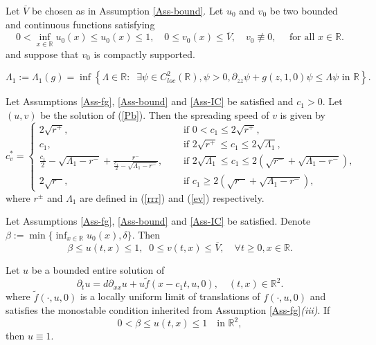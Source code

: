 \documentclass[10pt,a4paper]{amsart}
\newcommand{\R}{\mathbb{R}}
\renewcommand{\eqref}[1]{(\ref{#1})}
\begin{document}
\begin{assumption}\label{Ass-IC}
Let  $\overline{V}$ be chosen  as in Assumption \ref{Ass-bound}.  Let $u_0$ and $v_0$ be two bounded and continuous functions satisfying
$$
0<\inf_{x\in\R} u_0(x)\le u_0(x) \le 1,
\quad
0\le v_0(x)\le \overline{V},\quad
v_0\not\equiv 0,  \quad \text{ for all }   x\in \R. 
$$
and suppose that $v_0$ is compactly supported. 
\end{assumption}

\begin{equation}\label{ev}
\Lambda_1 := \Lambda_1(g)= \inf\left\{ \Lambda \in \R: \;\;  \exists \psi \in C^2_{loc} (\R), \psi>0,  \partial_{zz} \psi + g(z, 1,0) \psi \leq \Lambda \psi \text{ in } \R  \right\}.
\end{equation}

\begin{theorem}\label{Thm1}
Let Assumptions \ref{Ass-fg}, \ref{Ass-bound} and \ref{Ass-IC} be satisfied and $c_1>0$.  Let $(u,v)$ be the solution of  \eqref{Pb}.   Then the  spreading speed of $v$ is given by 
\begin{equation*}
c_v^*= \begin{cases}
2\sqrt{r^+}, & \text{ if  }  0<c_1 \leq 2 \sqrt{r^+}, \\
c_1,   & \text{ if }  2\sqrt{r^+} \leq c_1 \leq  2 \sqrt{\Lambda_1}, \\
\frac{c_1}{2} - \sqrt{\Lambda_1 - r^{-} }  + \frac{r^{-}}{\frac{c_1}{2} - \sqrt{\Lambda_1 - r^{-} }  },   \quad  & \text{ if  }   2 \sqrt{\Lambda_1}  \leq  c_1 \leq 2 (  \sqrt{r^-} + \sqrt{\Lambda_1 -r^{-}}),\\
2\sqrt{r^-},    & \text{ if  } c_1  \geq   2 (  \sqrt{r^-} + \sqrt{\Lambda_1 -r^{-}}),
\end{cases}
\end{equation*}
 where $r^{\pm}$ and $\Lambda_1$ are defined in \eqref{rrr} and \eqref{ev} respectively.   
\end{theorem}

\begin{lemma}\label{Lem-bound}
Let Assumptions \ref{Ass-fg}, \ref{Ass-bound} and \ref{Ass-IC} be satisfied. Denote $\beta:= \min\{  \inf_{x\in\R } u_0(x),   \delta \}$.  Then  
$$\beta \leq  u(t,x)\leq 1,   \;\; 0 \leq v(t,x) \leq   \overline{V}, \quad  \forall  t\geq 0, x\in \R. $$  
\end{lemma}

\begin{lemma}\label{Lem-liou}
Let $u$  be a bounded entire solution of
 \begin{equation*}
  \partial_t u= d \partial_{xx} u +  u \tilde{f}(x-c_1 t, u, 0), \quad  (t,x) \in \R^2.
 \end{equation*} 
where   $\tilde f(\cdot, u, 0)$  is a locally uniform limit of translations of  $f(\cdot, u, 0)$
and satisfies the monostable condition inherited from Assumption \ref{Ass-fg}\textit{(iii)}. 
If
\[
0<\beta\leq u(t,x)\leq 1 \quad \text{in } \mathbb R^2,
\]
then $u \equiv 1$.
\end{lemma}
\end{document}
